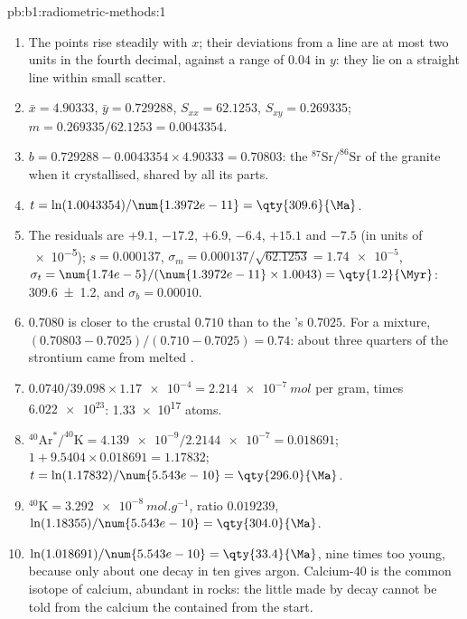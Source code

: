 \begin{solution}{pb:b1:radiometric-methods:1}
\begin{enumerate}
  \item The points rise steadily with $x$; their deviations from a line are at most
        two units in the fourth decimal, against a range of $0.04$ in $y$: they lie on a
        straight line within small scatter.
  \item $\bar x = 4.90333$, $\bar y = 0.729288$, $S_{xx} = 62.1253$, $S_{xy} =
        0.269335$; $m = 0.269335/62.1253 = 0.0043354$.
  \item $b = 0.729288 - 0.0043354 \times 4.90333 = 0.70803$: the
        $^{87}\mathrm{Sr}/^{86}\mathrm{Sr}$ of the granite when it crystallised,
        shared by all its parts.
  \item $t = \ln(1.0043354)/\num{1.3972e-11} = \qty{309.6}{\Ma}$.
  \item The residuals are $+9.1$, $-17.2$, $+6.9$, $-6.4$, $+15.1$ and $-7.5$ (in
        units of \num{e-5}); $s = 0.000137$, $\sigma_m = 0.000137/\sqrt{62.1253} =
        \num{1.74e-5}$, $\sigma_t = \num{1.74e-5}/(\num{1.3972e-11} \times 1.0043)
        = \qty{1.2}{\Myr}$: \qty[uncertainty-mode=separate]{309.6(12)}{\Ma}, and
        $\sigma_b = 0.00010$.
  \item $0.7080$ is closer to the crustal $0.710$ than to the 's $0.7025$.
        For a mixture, $(0.70803 - 0.7025)/(0.710 - 0.7025) = 0.74$: about three
        quarters of the strontium came from melted .
  \item $0.0740/39.098 \times \num{1.17e-4} = \qty{2.214e-7}{mol}$ per gram,
        times $\num{6.022e23}$: \num{1.33e17} atoms.
  \item $^{40}\mathrm{Ar}^*/^{40}\mathrm{K} = \num{4.139e-9}/\num{2.2144e-7} =
        0.018691$; $1 + 9.5404 \times 0.018691 = 1.17832$; $t =
        \ln(1.17832)/\num{5.543e-10} = \qty{296.0}{\Ma}$.
  \item $^{40}\mathrm{K} = \qty{3.292e-8}{mol.g^{-1}}$, ratio $0.019239$,
        $\ln(1.18355)/\num{5.543e-10} = \qty{304.0}{\Ma}$.
  \item $\ln(1.018691)/\num{5.543e-10} = \qty{33.4}{\Ma}$, nine times too young,
        because only about one decay in ten gives argon. Calcium-40 is the common
        isotope of calcium, abundant in rocks: the little made by decay cannot be
        told from the calcium the  contained from the start.

\end{enumerate}
\end{solution}
